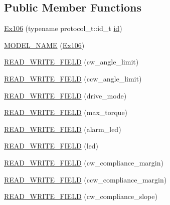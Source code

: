 \subsection*{Public Member Functions}
\begin{DoxyCompactItemize}
\item 
\hyperlink{classdynamixel_1_1servos_1_1_ex106_a5cb026fbd80322f319f7a9a6c27f4ecb}{Ex106} (typename protocol\+\_\+t\+::id\+\_\+t \hyperlink{classdynamixel_1_1servos_1_1_servo_a2d022081672e25a7bb57b76706e1cc57}{id})
\item 
\hyperlink{classdynamixel_1_1servos_1_1_ex106_ae13ecc7eb9c34da20d8d11f3f4600f95}{M\+O\+D\+E\+L\+\_\+\+N\+A\+ME} (\hyperlink{classdynamixel_1_1servos_1_1_ex106}{Ex106})
\item 
\hyperlink{classdynamixel_1_1servos_1_1_ex106_a6c548d2096483b62497719ac81d9f7be}{R\+E\+A\+D\+\_\+\+W\+R\+I\+T\+E\+\_\+\+F\+I\+E\+LD} (cw\+\_\+angle\+\_\+limit)
\item 
\hyperlink{classdynamixel_1_1servos_1_1_ex106_acddf5380832396bc8c9955f24d74d7d0}{R\+E\+A\+D\+\_\+\+W\+R\+I\+T\+E\+\_\+\+F\+I\+E\+LD} (ccw\+\_\+angle\+\_\+limit)
\item 
\hyperlink{classdynamixel_1_1servos_1_1_ex106_a33f7abd9665a5544b0c351a69c58ff77}{R\+E\+A\+D\+\_\+\+W\+R\+I\+T\+E\+\_\+\+F\+I\+E\+LD} (drive\+\_\+mode)
\item 
\hyperlink{classdynamixel_1_1servos_1_1_ex106_a5b5f02e57f126fbcbabd7684a2f79c71}{R\+E\+A\+D\+\_\+\+W\+R\+I\+T\+E\+\_\+\+F\+I\+E\+LD} (max\+\_\+torque)
\item 
\hyperlink{classdynamixel_1_1servos_1_1_ex106_a5ae3807680fc66b17851cd5be6f78013}{R\+E\+A\+D\+\_\+\+W\+R\+I\+T\+E\+\_\+\+F\+I\+E\+LD} (alarm\+\_\+led)
\item 
\hyperlink{classdynamixel_1_1servos_1_1_ex106_aca25b23f0ee40a0d57f8d91b90127643}{R\+E\+A\+D\+\_\+\+W\+R\+I\+T\+E\+\_\+\+F\+I\+E\+LD} (led)
\item 
\hyperlink{classdynamixel_1_1servos_1_1_ex106_a799bce434006422ae17e535b8e0e1300}{R\+E\+A\+D\+\_\+\+W\+R\+I\+T\+E\+\_\+\+F\+I\+E\+LD} (cw\+\_\+compliance\+\_\+margin)
\item 
\hyperlink{classdynamixel_1_1servos_1_1_ex106_a56b71253ea81d01ef0b80fa0882a861d}{R\+E\+A\+D\+\_\+\+W\+R\+I\+T\+E\+\_\+\+F\+I\+E\+LD} (ccw\+\_\+compliance\+\_\+margin)
\item 
\hyperlink{classdynamixel_1_1servos_1_1_ex106_a5763b2f7b4f88d08e5e77dcaad42b956}{R\+E\+A\+D\+\_\+\+W\+R\+I\+T\+E\+\_\+\+F\+I\+E\+LD} (cw\+\_\+compliance\+\_\+slope)
\item 

\end{DoxyCompactItemize}
